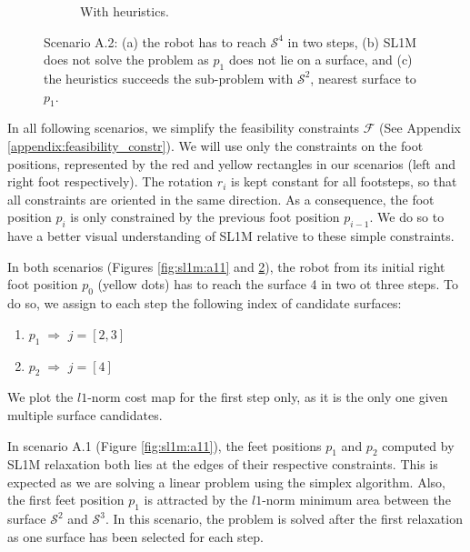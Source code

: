 \begin{figure}[ht]
\begin{subfigure}[t]{0.48\linewidth}
    \caption{With heuristics.}
    \label{fig:sl1m:a12:1}
    \end{subfigure}
    \caption{Scenario A.2: (a) the robot has to reach $\mathcal{S}^4$ in two steps, (b) SL1M does not solve the problem as $p_1$ does not lie on a surface, and (c) the heuristics succeeds the sub-problem with $\mathcal{S}^2$, nearest surface to $p_1$.}
    \label{fig:sl1m:a12}
\end{figure}
In all following scenarios, we simplify the feasibility constraints $\mathcal{F}$ (See Appendix \ref{appendix:feasibility_constr}).
We will use only the constraints on the foot positions, represented by the red and yellow rectangles in our scenarios (left and right foot respectively).
The rotation $r_i$ is kept constant for all footsteps, so that all constraints are oriented in the same direction.
As a consequence, the foot position $p_i$ is only constrained by the previous foot position $p_{i-1}$.
We do so to have a better visual understanding of SL1M relative to these simple constraints.

In both scenarios (Figures \ref{fig:sl1m:a11} and \ref{fig:sl1m:a12}), the robot from its initial right foot position $p_0$ (yellow dots) has to reach the surface 4 in two ot three steps. To do so, we assign to each step the following index of candidate surfaces:
\begin{enumerate}
    \item $p_1 \; \Rightarrow$ \; $j = [2,3]$
    \item $p_2 \; \Rightarrow$ \; $j = [4]$
\end{enumerate}
We plot the $l1$-norm cost map for the first step only, as it is the only one given multiple surface candidates.

In scenario A.1 (Figure \ref{fig:sl1m:a11}), the feet positions $p_1$ and $p_2$ computed by SL1M relaxation both lies at the edges of their respective constraints. This is expected as we are solving a linear problem using the simplex algorithm.
Also, the first feet position $p_1$ is attracted by the $l1$-norm minimum area between the surface $\mathcal{S}^2$ and $\mathcal{S}^3$. 
In this scenario, the problem is solved after the first relaxation as one surface has been selected for each step.

